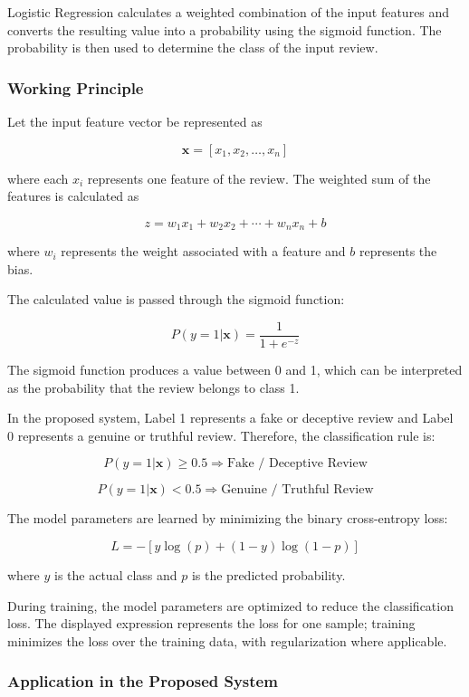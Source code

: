 \documentclass[12pt,a4paper]{report}
\begin{document}
Logistic Regression calculates a weighted combination of the input features and converts the resulting value into a probability using the sigmoid function. The probability is then used to determine the class of the input review.

\subsubsection*{Working Principle}

Let the input feature vector be represented as

\[
\mathbf{x} = [x_1,x_2,\ldots,x_n]
\]

where each \(x_i\) represents one feature of the review. The weighted sum of the features is calculated as

\[
z = w_1x_1 + w_2x_2 + \cdots + w_nx_n + b
\]

where \(w_i\) represents the weight associated with a feature and \(b\) represents the bias.

The calculated value is passed through the sigmoid function:

\[
P(y=1|\mathbf{x}) =
\frac{1}{1+e^{-z}}
\]

The sigmoid function produces a value between 0 and 1, which can be interpreted as the probability that the review belongs to class 1.

In the proposed system, Label 1 represents a fake or deceptive review and Label 0 represents a genuine or truthful review. Therefore, the classification rule is:

\[
P(y=1|\mathbf{x}) \geq 0.5
\Rightarrow \text{Fake / Deceptive Review}
\]

\[
P(y=1|\mathbf{x}) < 0.5
\Rightarrow \text{Genuine / Truthful Review}
\]

The model parameters are learned by minimizing the binary cross-entropy loss:

\[
L =
-\left[y\log(p)+(1-y)\log(1-p)\right]
\]

where \(y\) is the actual class and \(p\) is the predicted probability.

During training, the model parameters are optimized to reduce the classification loss. The displayed expression represents the loss for one sample; training minimizes the loss over the training data, with regularization where applicable.

\subsubsection*{Application in the Proposed System}
\end{document}
